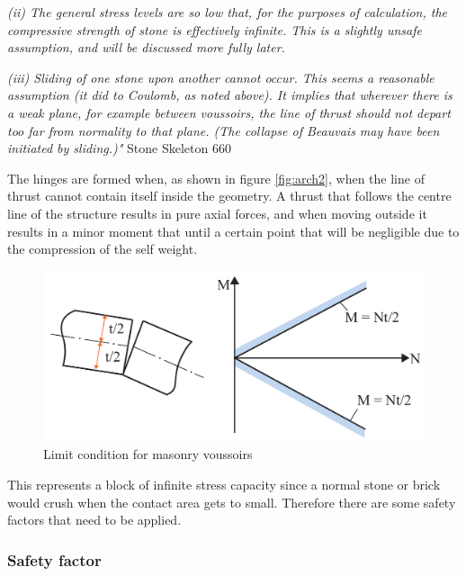 \textit{(ii) The general stress levels are so low that, for the purposes of calculation, the compressive
strength of stone is effectively infinite. This is a slightly unsafe assumption, and
will be discussed more fully later.}

\textit{(iii) Sliding of one stone upon another cannot occur. This seems a reasonable assumption
(it did to Coulomb, as noted above). It implies that wherever there is a weak plane, for
example between voussoirs, the line of thrust should not depart too far from normality
to that plane. (The collapse of Beauvais may have been initiated by sliding.)" }Stone Skeleton 660

The hinges are formed when, as shown in figure \ref{fig:arch2}, when the line of thrust cannot contain itself inside the geometry. A thrust that follows the centre line of the structure results in pure axial forces, and when moving outside it results in a minor moment that until a certain point that will be negligible due to the compression of the self weight.

\begin{figure}[H]
\centering
\includegraphics[width=0.9\linewidth ]{figure/Theory/Plasticity.pdf}
\caption{Limit condition for masonry voussoirs}
\end{figure}

This represents a block of infinite stress capacity since a normal stone or brick would crush when the contact area gets to small. Therefore there are some safety factors that need to be applied.


\subsubsection{Safety factor}

